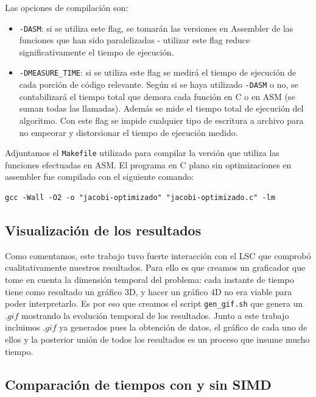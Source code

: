 \documentclass[a4paper]{article}
\begin{document}
Las opciones de compilación son:

\begin{itemize}
\item \texttt{-DASM}: si se utiliza este flag, se tomarán las versiones
en Assembler de las funciones que han sido paralelizadas - utilizar este
flag reduce significativamente el tiempo de ejecución.
\item \texttt{-DMEASURE\_TIME}: si se utiliza este flag se medirá el tiempo
de ejecución de cada porción de código relevante. Según si se haya utilizado
\texttt{-DASM} o no, se contabilizará el tiempo total que demora cada función en C
o en ASM (se suman todas las llamadas). Además se mide el tiempo total
de ejecución del algoritmo. Con este flag se impide cualquier tipo de
escritura a archivo para no empeorar y distorsionar el tiempo de ejecución
medido.
\end{itemize}

Adjuntamos el \texttt{Makefile} utilizado para compilar la versión que
utiliza las funciones efectuadas en ASM. El programa en C plano sin
optimizaciones en assembler fue compilado con el siguiente comando:

\begin{center}
\begin{verbatim}
gcc -Wall -O2 -o "jacobi-optimizado" "jacobi-optimizado.c" -lm
\end{verbatim}
\end{center}

\subsection{Visualización de los resultados}

Como comentamos, este trabajo tuvo fuerte interacción con el LSC que
comprobó cualitativamente nuestros resultados. Para ello es que creamos
un graficador que tome en cuenta la dimensión temporal del problema: 
cada instante de tiempo tiene como resultado un gráfico 3D, y hacer un
gráfico 4D no era viable para poder interpretarlo. Es por eso que
creamos el script \texttt{gen\_gif.sh} que genera un $.gif$ mostrando
la evolución temporal de los resultados. Junto a este trabajo incluimos 
$.gif$ ya generados pues la obtención de datos, el gráfico de cada uno de
ellos y la posterior unión de todos los resultados es un proceso que 
insume mucho tiempo.

\subsection{Comparación de tiempos con y sin SIMD}
\end{document}
